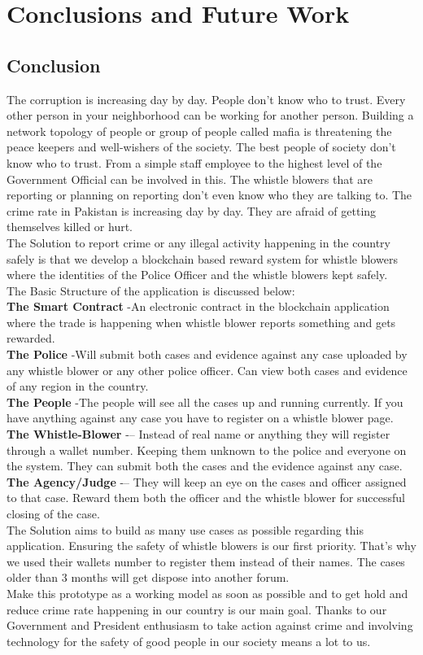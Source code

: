 \chapter{Conclusions and Future Work}

\section{Conclusion}
The corruption is increasing day by day. People don’t know who to trust. Every other person in your neighborhood can be working for another person. Building a network topology of people or group of people called mafia is threatening the peace keepers and well-wishers of the society. The best people of society don’t know who to trust. From a simple staff employee to the highest level of the Government Official can be involved in this. The whistle blowers that are reporting or planning on reporting don’t even know who they are talking to. The crime rate in Pakistan is increasing day by day. They are afraid of getting themselves killed or hurt.\\
The Solution to report crime or any illegal activity happening in the country safely is that we develop a blockchain based reward system for whistle blowers where the identities of the Police Officer and the whistle blowers kept safely.\\
The Basic Structure of the application is discussed below:\\
\textbf{The Smart Contract  }-An electronic contract in the blockchain application where the trade is happening when whistle blower reports something and gets rewarded.\\ 
\textbf{The Police }-Will submit both cases and evidence against any case uploaded by any whistle blower or any other police officer. Can view both cases and evidence of any region in the country.\\
\textbf{The People  }-The people will see all the cases up and running currently. If you have anything against any case you have to register on a whistle blower page. \\
\textbf{The Whistle-Blower  }-– Instead of real name or anything they will register through a wallet number. Keeping them unknown to the police and everyone on the system. They can submit both the cases and the evidence against any case.\\
\textbf{The Agency/Judge  }-– They will keep an eye on the cases and officer assigned to that case. Reward them both the officer and the whistle blower for successful closing of the case.\\
The Solution aims to build as many use cases as possible regarding this application. Ensuring the safety of whistle blowers is our first priority. That’s why we used their wallets number to register them instead of their names. The cases older than 3 months will get dispose into another forum.\\ 
Make this prototype as a working model as soon as possible and to get hold and reduce crime rate happening in our country is our main goal. Thanks to our Government and President enthusiasm to take action against crime and involving technology for the safety of good people in our society means a lot to us.  
